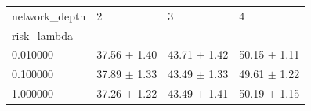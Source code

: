 \begin{tabular}{llll}
\toprule
network_depth & 2 & 3 & 4 \\
risk_lambda &  &  &  \\
\midrule
0.010000 & 37.56 $\pm$ 1.40 & 43.71 $\pm$ 1.42 & 50.15 $\pm$ 1.11 \\
0.100000 & 37.89 $\pm$ 1.33 & 43.49 $\pm$ 1.33 & 49.61 $\pm$ 1.22 \\
1.000000 & 37.26 $\pm$ 1.22 & 43.49 $\pm$ 1.41 & 50.19 $\pm$ 1.15 \\
\bottomrule
\end{tabular}
